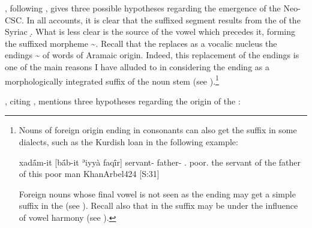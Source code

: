 \citet[378--380]{MengozziExtended}, following \citet[169]{KhanArbel}, gives three possible hypotheses regarding the emergence of the Neo-CSC. In all accounts, it is clear that the suffixed segment  results from the  of the Syriac  \d. What is less clear is the source of the  vowel which precedes it, forming the suffixed morpheme \~. Recall that the  replaces as a vocalic nucleus the  endings \~ of words of Aramaic origin. Indeed, this replacement of the   endings is one of the main reasons I have alluded to in considering the \ed ending as a morphologically integrated suffix of the noun stem (see ).\footnote{Nouns of foreign origin ending in consonants can also get the \ed suffix in some dialects, such as the Kurdish loan  in the following example:

{xadā́m-it [bā́b-it ʾiyyà faqī́r]}
{servant-\cst{} father-\cst{} \dem.\near{} poor.\sg}
{the servant of the father of this poor man}
{KhanArbel}{424 {[S:31]}}

 Foreign nouns whose final vowel is not seen as the  ending may get a simple  suffix in the \cst* (see ). Recall also that in \JUrm the suffix may be  under the influence of vowel harmony (see ).} 

\citet[379f.]{MengozziExtended}, citing \citet[169]{KhanArbel}, mentions three hypotheses regarding the origin of the :


